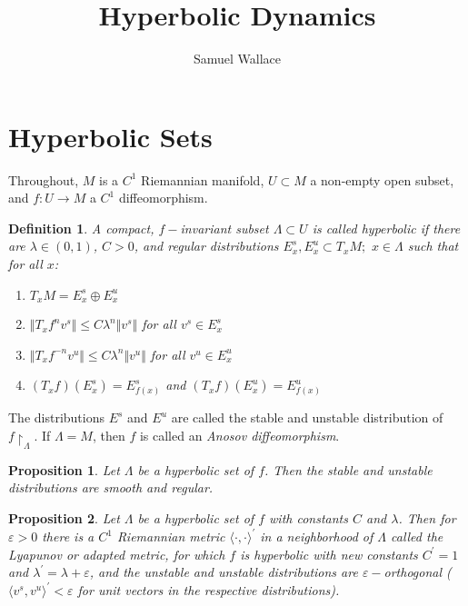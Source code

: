 \documentclass{article}
\title{Hyperbolic Dynamics}
\author{Samuel Wallace}
\newtheorem{defn}{Definition}
\newtheorem{prop}{Proposition}
\begin{document}
\maketitle

\section{Hyperbolic Sets}

\indent Throughout, $M$ is a $C^1$ Riemannian manifold, $U \subset M$ a non-empty open subset, and $f:U \to M$ a $C^1$ diffeomorphism. 

\begin{defn}

\indent A compact, $f-$invariant subset $\Lambda \subset U$ is called \textit{hyperbolic} if there are $\lambda \in (0,1)$, $C>0$, and regular distributions $E^s_x, E^u_x \subset T_x M; \hspace{4pt} x \in \Lambda$ such that for all $x$:
\begin{enumerate}
    \item $T_x M = E^s_x \oplus E^u_x$
    \item $\Vert T_x f^n v^s \Vert \leq C \lambda^n \Vert v^s \Vert$ for all $v^s \in E^s_x$
    \item $\Vert T_x f^{-n} v^u \Vert \leq C \lambda^n \Vert v^u \Vert $ for all $v^u \in E^u_x$
    \item $(T_x f) (E^s_x) = E^s_{f(x)}$ and $(T_xf)(E^u_x) = E^u_{f(x)}$
\end{enumerate}
\end{defn}

\indent The distributions $E^s$ and $E^u$ are called the stable and unstable distribution of $f \restriction_{\Lambda}$. If $\Lambda = M$, then $f$ is called an \textit{Anosov diffeomorphism}.

\begin{prop}

Let $\Lambda$ be a hyperbolic set of $f$. Then the stable and unstable distributions are smooth and regular.

\end{prop}


\begin{prop}
Let $\Lambda$ be a hyperbolic set of $f$ with constants $C$ and $\lambda$. Then for $\varepsilon > 0$ there is a $C^1$ Riemannian metric $\langle \cdot, \cdot \rangle^{\prime}$ in a neighborhood of $\Lambda$ called the \textit{Lyapunov} or \textit{adapted} metric, for which $f$ is hyperbolic with new constants $C^{\prime} = 1$ and $\lambda^{\prime}=\lambda + \varepsilon$, and the unstable and unstable distributions are $\varepsilon-$orthogonal ($\langle v^s, v^u \rangle^{\prime} < \varepsilon$ for unit vectors in the respective distributions).
\end{prop}
\end{document}
